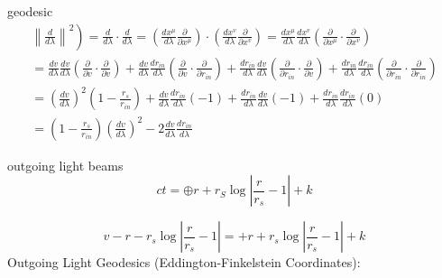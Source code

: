 geodesic\begin{equation}
    \begin{array}{l}
        \left.\left\|\frac{d}{d \lambda}\right\|^2\right)=\frac{d}{d \lambda} \cdot \frac{d}{d \lambda}=\left(\frac{d x^\mu}{d \lambda} \frac{\partial}{\partial x^\mu}\right) \cdot\left(\frac{d x^v}{d \lambda} \frac{\partial}{\partial x^v}\right)=\frac{d x^\mu}{d \lambda} \frac{d x^v}{d \lambda}\left(\frac{\partial}{\partial x^\mu} \cdot \frac{\partial}{\partial x^v}\right)                                                                                                                                                         \\
        =\frac{d v}{d \lambda} \frac{d v}{d \lambda}\left(\frac{\partial}{\partial v} \cdot \frac{\partial}{\partial v}\right)+\frac{d v}{d \lambda} \frac{d r_{i n}}{d \lambda}\left(\frac{\partial}{\partial v} \cdot \frac{\partial}{\partial r_{i n}}\right)+\frac{d r_{i n}}{d \lambda} \frac{d v}{d \lambda}\left(\frac{\partial}{\partial r_{i n}} \cdot \frac{\partial}{\partial v}\right)+\frac{d r_{i n}}{d \lambda} \frac{d r_{i n}}{d \lambda}\left(\frac{\partial}{\partial r_{i n}} \cdot \frac{\partial}{\partial r_{i n}}\right) \\
        =\left(\frac{d v}{d \lambda}\right)^2\left(1-\frac{r_s}{r_{i n}}\right)+\frac{d v}{d \lambda} \frac{d r_{i n}}{d \lambda}(-1)+\frac{d r_{i n}}{d \lambda} \frac{d v}{d \lambda}(-1)+\frac{d r_{i n}}{d \lambda} \frac{d r_{i n}}{d \lambda}(0)                                                                                                                                                                                                                                                                                           \\
        =\left(1-\frac{r_s}{r_{i n}}\right)\left(\frac{d v}{d \lambda}\right)^2-2 \frac{d v}{d \lambda} \frac{d r_{i n}}{d \lambda}
    \end{array}
\end{equation}

outgoing light beams
\begin{equation}
    c t=\oplus r+r_S \log \left|\frac{r}{r_s}-1\right|+k
\end{equation}

\begin{equation}
    v-r-r_s \log \left|\frac{r}{r_s}-1\right|=+r+r_s \log \left|\frac{r}{r_s}-1\right|+k
\end{equation}
Outgoing Light Geodesics (Eddington-Finkelstein Coordinates):

